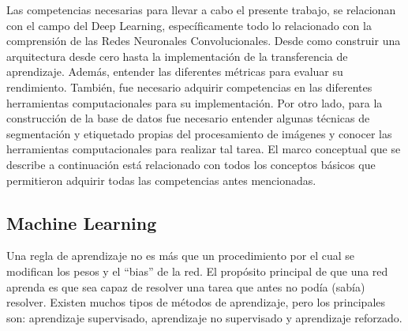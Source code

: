 Las competencias necesarias para llevar a cabo el presente trabajo, se relacionan con el campo del Deep Learning, específicamente todo lo relacionado con la comprensión de las Redes Neuronales Convolucionales. Desde como construir una arquitectura desde cero hasta la implementación de la transferencia de aprendizaje. Además, entender las diferentes métricas para evaluar su rendimiento. También, fue necesario adquirir competencias en las diferentes herramientas computacionales para su implementación. 
Por otro lado, para la construcción de la base de datos fue necesario entender algunas técnicas de segmentación y etiquetado propias del procesamiento de imágenes y conocer las herramientas computacionales para realizar tal tarea. 
El marco conceptual que se describe a continuación está relacionado con todos los conceptos básicos que permitieron adquirir todas las competencias antes mencionadas.

\subsection{Machine Learning}

Una regla de aprendizaje no es más que un procedimiento por el cual se modifican los pesos y el “bias” de la red. El propósito principal de que una red aprenda es que sea capaz de resolver una tarea que antes no podía (sabía) resolver. Existen muchos tipos de métodos de aprendizaje, pero los principales son: aprendizaje supervisado, aprendizaje no supervisado y aprendizaje reforzado\cite{Algoritmos}.

